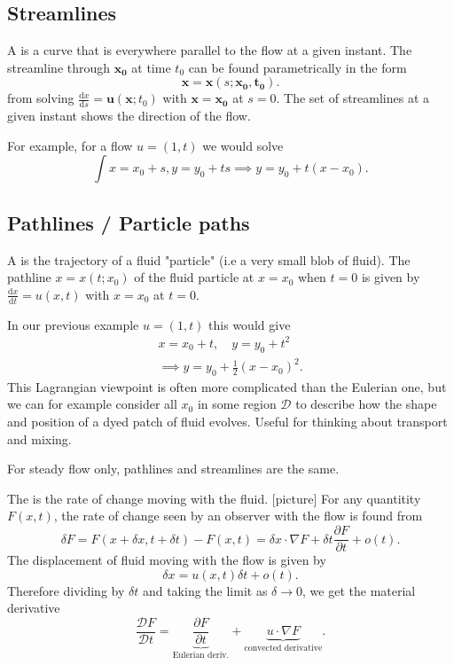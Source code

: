 \documentclass[a4paper]{scrartcl}
\begin{document}
\subsection{Streamlines}
\begin{definition}[Streamline]
     A  is a curve that is everywhere parallel to the flow at a given instant. The streamline through $\bm{x_0 } $ at time $t_0 $ can be found parametrically in the form \[
     \bm{x} =\bm{x} (s; \bm{x_0 } , \bm{t_0 } )
     .\] from solving $\frac{\mathrm{d}x}{\mathrm{d}s}=\bm{u} (\bm{x};t_0 )$ with $\bm{x} =\bm{x_0 } $ at $s=0$. The set of streamlines at a given instant shows the direction of the flow.
\end{definition}
For example, for a flow $u= (1,t)$ we would solve \[
\int x = x_0 +s, y=y_0 +ts \implies y=y_0 +t (x-x_0 )
.\] 
\subsection{Pathlines / Particle paths}
\begin{definition}
     A  is the trajectory of a fluid "particle" (i.e a very small blob of fluid). The pathline $x=x (t;x_0 )$ of the fluid particle at $x=x_0 $ when $t=0$ is given by $\frac{\mathrm{d}x}{\mathrm{d}t}=u (x,t)$ with $x=x_0 $ at $t=0$.
\end{definition}
In our previous example $u= (1,t)$ this would give 
\begin{align*}
    x=x_0 +t, \quad y=y_0 +t^2 \\
    \implies y=y_0 + \frac{1}{2} (x-x_0)^2.
\end{align*}
This Lagrangian viewpoint is often more complicated than the Eulerian one, but we can for example consider all $x_0 $ in some region $\mathcal{D}$ to describe how the shape and position of a dyed patch of fluid evolves. Useful for thinking about transport and mixing.
\begin{remark}
     For steady flow only, pathlines and streamlines are the same. 
\end{remark}
\begin{definition}
     The  is the rate of change moving with the fluid. [picture] For any quantitity $F (x,t)$, the rate of change seen by an observer with the flow is found from \[
     \delta F =F (x+\delta x, t+\delta t)-F (x,t)=\delta x \cdot \nabla F +\delta t \frac{\partial F}{\partial t}+o (t)
     .\] 
     The displacement of fluid moving with the flow is given by \[
     \delta x= u (x,t) \delta t + o (t)
     .\] Therefore dividing by $\delta t$ and taking the limit as $\delta \rightarrow 0$, we get the material derivative \[
     \frac{\mathcal{D}F}{\mathcal{D}t}=\underbrace{\frac{\partial F}{\partial t}}_{\text{Eulerian deriv.} } + \underbrace{u \cdot \nabla F}_{\text{convected derivative} } 
     .\] 
\end{definition}
\end{document}
